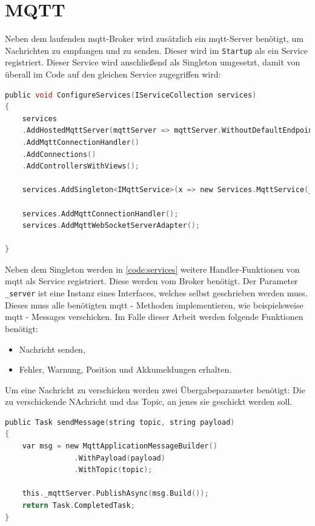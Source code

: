 \section{MQTT}
\label{sec:serverMqtt}
Neben dem laufenden \acrshort{mqtt}-Broker wird zusätzlich ein \acrshort{mqtt}-Server benötigt, um Nachrichten zu empfangen und zu senden. Dieser wird im \texttt{Startup} als ein Service registriert. Dieser Service wird anschließend als Singleton umgesetzt, damit von überall im Code auf den gleichen Service zugegriffen wird:

\begin{lstlisting}[language=c, style=dhpaperdefault]
public void ConfigureServices(IServiceCollection services)
{
	services
	.AddHostedMqttServer(mqttServer => mqttServer.WithoutDefaultEndpoint())
	.AddMqttConnectionHandler()
	.AddConnections()
	.AddControllersWithViews();

	services.AddSingleton<IMqttService>(x => new Services.MqttService(_server));

	services.AddMqttConnectionHandler();
	services.AddMqttWebSocketServerAdapter();

}
\end{lstlisting}

Neben dem Singleton werden in \autoref{code:services} weitere Handler-Funktionen von \acrshort{mqtt} als Service registriert. Diese werden vom Broker benötigt. Der Parameter \texttt{\_server} ist eine Instanz eines Interfaces, welches selbst geschrieben werden muss. Dieses muss alle benötigten \acrshort{mqtt} - Methoden implementieren, wie beispielsweise \acrshort{mqtt} - Messages verschicken. Im Falle dieser Arbeit werden folgende Funktionen benötigt:

\begin{center}
	\begin{itemize}
		\item Nachricht senden,
		\item Fehler, Warnung, Position und Akkumeldungen erhalten.
	\end{itemize}
\end{center}

Um eine Nachricht zu verschicken werden zwei Übergabeparameter benötigt: Die zu verschickende NAchricht und das Topic, an jenes sie geschickt werden soll. 

\begin{lstlisting}[language=c, style=dhpaperdefault]
public Task sendMessage(string topic, string payload)
{
	var msg = new MqttApplicationMessageBuilder()
				.WithPayload(payload)
				.WithTopic(topic);

	this._mqttServer.PublishAsync(msg.Build());
	return Task.CompletedTask;
}
\end{lstlisting}

